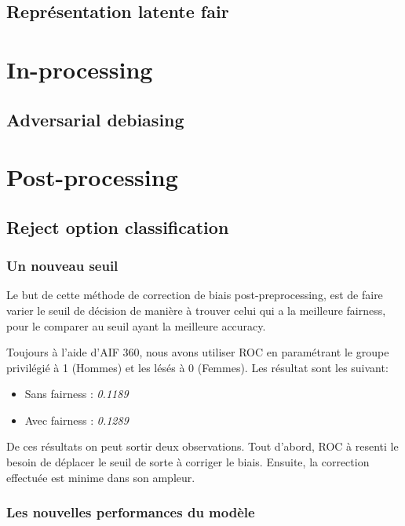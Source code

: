 \documentclass{article}
\begin{document}
    \subsection{Représentation latente fair}
    

    \section{In-processing}

    \subsection{Adversarial debiasing}

    \section{Post-processing}

    \subsection{Reject option classification}
    \subsubsection{Un nouveau seuil}

    Le but de cette méthode de correction de biais post-preprocessing, est de faire varier le seuil de décision de manière à 
    trouver celui qui a la meilleure fairness, pour le comparer au seuil ayant la meilleure accuracy.

    Toujours à l'aide d'AIF 360, nous avons utiliser ROC en paramétrant le groupe privilégié à 1 (Hommes) et les lésés à 0 (Femmes).
    Les résultat sont les suivant: 

    \begin{itemize}
        \item Sans fairness : \textit{0.1189}
        \item Avec fairness : \textit{0.1289}
    \end{itemize}
    
    De ces résultats on peut sortir deux observations. Tout d'abord, ROC à resenti le besoin de déplacer le seuil de sorte à corriger 
    le biais. Ensuite, la correction effectuée est minime dans son ampleur. 

    \subsubsection{Les nouvelles performances du modèle}
\end{document}
